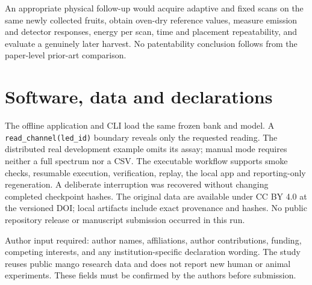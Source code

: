 \documentclass[11pt,a4paper]{article}
\begin{document}
An appropriate physical follow-up would acquire adaptive and fixed scans on the same newly collected fruits, obtain oven-dry reference values, measure emission and detector responses, energy per scan, time and placement repeatability, and evaluate a genuinely later harvest. No patentability conclusion follows from the paper-level prior-art comparison.

\section{Software, data and declarations}
The offline application and CLI load the same frozen bank and model. A \texttt{read\_channel(led\_id)} boundary reveals only the requested reading. The distributed real development example omits its assay; manual mode requires neither a full spectrum nor a CSV. The executable workflow supports smoke checks, resumable execution, verification, replay, the local app and reporting-only regeneration. A deliberate interruption was recovered without changing completed checkpoint hashes. The original data are available under CC BY 4.0 at the versioned DOI; local artifacts include exact provenance and hashes. No public repository release or manuscript submission occurred in this run.

Author input required: author names, affiliations, author contributions, funding, competing interests, and any institution-specific declaration wording. The study reuses public mango research data and does not report new human or animal experiments. These fields must be confirmed by the authors before submission.

\clearpage


\end{document}
